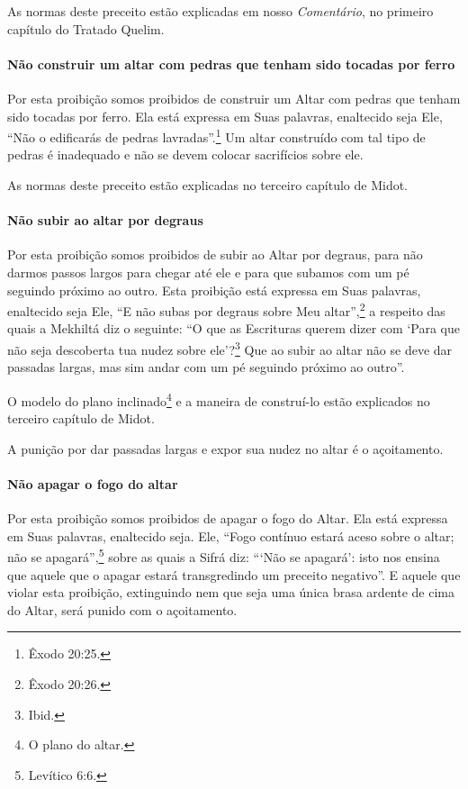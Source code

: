 As normas deste preceito estão explicadas em nosso \emph{Comentário}, no
primeiro capítulo do Tratado Quelim.

\paragraph{Não construir um altar com pedras que tenham sido tocadas por ferro}

Por esta proibição somos proibidos de construir um Altar com pedras que
tenham sido tocadas por ferro. Ela está expressa em Suas palavras,
enaltecido seja Ele, ``Não o edificarás de pedras lavradas''.\footnote{Êxodo
20:25.} Um altar construído com tal tipo de pedras é inadequado e não se
devem colocar sacrifícios sobre ele.

As normas deste preceito estão explicadas no terceiro capítulo de Midot.

\paragraph{Não subir ao altar por degraus}

Por esta proibição somos proibidos de subir ao Altar por degraus, para
não darmos passos largos para chegar até ele e para que subamos com um
pé seguindo próximo ao outro. Esta proibição está expressa em Suas
palavras, enaltecido seja Ele, ``E não subas por degraus sobre Meu
altar'',\footnote{Êxodo 20:26.} a respeito das quais a Mekhiltá diz o seguinte: ``O que as Escrituras querem dizer com `Para que não seja descoberta tua nudez sobre ele'?\footnote{Ibid.} Que ao subir ao altar não se deve dar passadas largas, mas sim
andar com um pé seguindo próximo ao outro''.

O modelo do plano inclinado\footnote{O plano do altar.} e a maneira de
construí-lo estão explicados no terceiro capítulo de Midot.

A punição por dar passadas largas e expor sua nudez no altar é o
açoitamento.

\paragraph{Não apagar o fogo do altar}

Por esta proibição somos proibidos de apagar o fogo do Altar. Ela está
expressa em Suas palavras, enaltecido seja. Ele, ``Fogo contínuo estará
aceso sobre o altar; não se apagará'',\footnote{Levítico 6:6.} sobre as quais a
Sifrá diz: ```Não se apagará': isto nos ensina que aquele que o apagar
estará transgredindo um preceito negativo''. E aquele que violar esta
proibição, extinguindo nem que seja uma única brasa ardente de cima do
Altar, será punido com o açoitamento.

